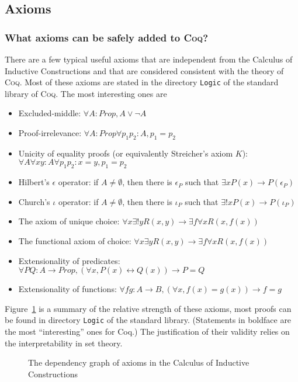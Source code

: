 \documentclass[a4paper,pdftex]{article}
\def\Question#1{\stepcounter{question}\subsubsection{#1}}
\def\Coq{\textsc{Coq}}
\begin{document}
\subsection{Axioms}

\Question{What axioms can be safely added to {\Coq}?}

There are a few typical useful axioms that are independent from the
Calculus of Inductive Constructions and that are considered consistent with
the theory of {\Coq}.
Most of these axioms are stated in the directory {\tt Logic} of the
standard library of {\Coq}. The most interesting ones are

\begin{itemize}
\item Excluded-middle: $\forall A:Prop, A \vee \neg A$
\item Proof-irrelevance: $\forall A:Prop \forall p_1 p_2:A, p_1=p_2$
\item Unicity of equality proofs (or equivalently Streicher's axiom $K$):
$\forall A \forall x y:A \forall p_1 p_2:x=y, p_1=p_2$
\item Hilbert's $\epsilon$ operator: if $A \neq \emptyset$, then there is $\epsilon_P$ such that $\exists x P(x) \rightarrow P(\epsilon_P)$
\item Church's $\iota$ operator: if $A \neq \emptyset$, then there is $\iota_P$ such that $\exists! x P(x) \rightarrow P(\iota_P)$
\item The axiom of unique choice: $\forall x \exists! y R(x,y) \rightarrow \exists f \forall x R(x,f(x))$
\item The functional axiom of choice: $\forall x \exists y R(x,y) \rightarrow \exists f \forall x R(x,f(x))$
\item Extensionality of predicates: $\forall P Q:A\rightarrow Prop, (\forall x, P(x) \leftrightarrow Q(x)) \rightarrow P=Q$
\item Extensionality of functions: $\forall f g:A\rightarrow B, (\forall x, f(x)=g(x)) \rightarrow f=g$
\end{itemize}

Figure~\ref{fig:axioms} is a summary of the relative strength of these
axioms, most proofs can be found in directory {\tt Logic} of the standard
library. (Statements in boldface are the most ``interesting'' ones for
Coq.) The justification of their validity relies on the interpretability
in set theory.

\begin{figure}[htbp]
\begin{center}
\ifpdf   %
\scalebox{0.65}{}
\else
\scalebox{0.65}{}
\fi
\end{center}
\caption{The dependency graph of axioms in the Calculus of Inductive Constructions}
\label{fig:axioms}
\end{figure}
\end{document}
